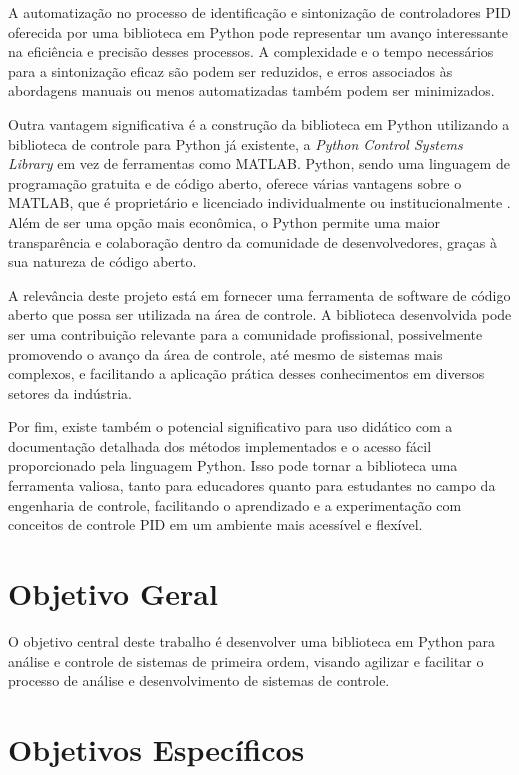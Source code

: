 A automatização no processo de identificação e sintonização de controladores PID oferecida por uma biblioteca em Python
pode representar um avanço interessante na eficiência e precisão desses processos.
A complexidade e o tempo necessários para a sintonização eficaz são podem ser reduzidos, e erros
associados às abordagens manuais ou menos automatizadas também podem ser minimizados.

Outra vantagem significativa é a construção da biblioteca em Python utilizando a biblioteca de
controle para Python já existente, a \textit{Python Control Systems Library} em vez de ferramentas como MATLAB.
Python, sendo uma linguagem de programação gratuita e de código aberto, oferece várias vantagens sobre o MATLAB, que é
proprietário e licenciado individualmente ou institucionalmente \cite{introart3}.
Além de ser uma opção mais econômica, o Python permite uma maior transparência e colaboração dentro da comunidade de
desenvolvedores, graças à sua natureza de código aberto.

A relevância deste projeto está em fornecer uma ferramenta de software de código aberto que possa ser utilizada na área
de controle.
A biblioteca desenvolvida pode ser uma contribuição relevante para a comunidade profissional, possivelmente promovendo
o avanço da área de controle, até mesmo de sistemas mais complexos, e facilitando a aplicação prática desses
conhecimentos em diversos setores da indústria.

Por fim, existe também o potencial significativo para uso didático com a documentação detalhada dos métodos
implementados e o acesso fácil proporcionado pela linguagem Python.
Isso pode tornar a biblioteca uma ferramenta valiosa, tanto para educadores quanto para estudantes no campo da
engenharia de controle, facilitando o aprendizado e a experimentação com conceitos de controle PID em um ambiente mais
acessível e flexível.

\section{Objetivo Geral}\label{sec:objg}

O objetivo central deste trabalho é desenvolver uma biblioteca em Python para análise
e controle de sistemas de primeira ordem, visando agilizar e facilitar o processo de
análise e desenvolvimento de sistemas de controle.

\section{Objetivos Específicos}\label{sec:objs}


